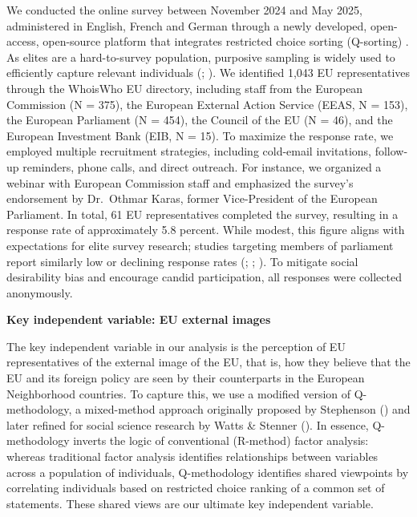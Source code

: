 \documentclass[
  letterpaper,
  DIV=11,
  numbers=noendperiod]{scrartcl}
\begin{document}
We conducted the online survey between November 2024 and May 2025,
administered in English, French and German through a newly developed,
open-access, open-source platform that integrates restricted choice
sorting (Q-sorting) . As elites are a hard-to-survey population,
purposive sampling is widely used to efficiently capture relevant
individuals (;
). We
identified 1,043 EU representatives through the WhoisWho EU directory,
including staff from the European Commission (N = 375), the European
External Action Service (EEAS, N = 153), the European Parliament (N =
454), the Council of the EU (N = 46), and the European Investment Bank
(EIB, N = 15). To maximize the response rate, we employed multiple
recruitment strategies, including cold-email invitations, follow-up
reminders, phone calls, and direct outreach. For instance, we organized
a webinar with European Commission staff and emphasized the survey's
endorsement by Dr.~Othmar Karas, former Vice-President of the European
Parliament. In total, 61 EU representatives completed the survey,
resulting in a response rate of approximately 5.8 percent. While modest,
this figure aligns with expectations for elite survey research; studies
targeting members of parliament report similarly low or declining
response rates (;
;
). To mitigate
social desirability bias and encourage candid participation, all
responses were collected anonymously.

\textbf{Key independent variable: EU external images}

The key independent variable in our analysis is the perception of EU
representatives of the external image of the EU, that is, how they
believe that the EU and its foreign policy are seen by their
counterparts in the European Neighborhood countries. To capture this, we
use a modified version of Q-methodology, a mixed-method approach
originally proposed by Stephenson
() and later refined for
social science research by Watts \& Stenner
(). In essence, Q-methodology inverts
the logic of conventional (R-method) factor analysis: whereas
traditional factor analysis identifies relationships between variables
across a population of individuals, Q-methodology identifies shared
viewpoints by correlating individuals based on restricted choice ranking
of a common set of statements. These shared views are our ultimate key
independent variable.
\end{document}
